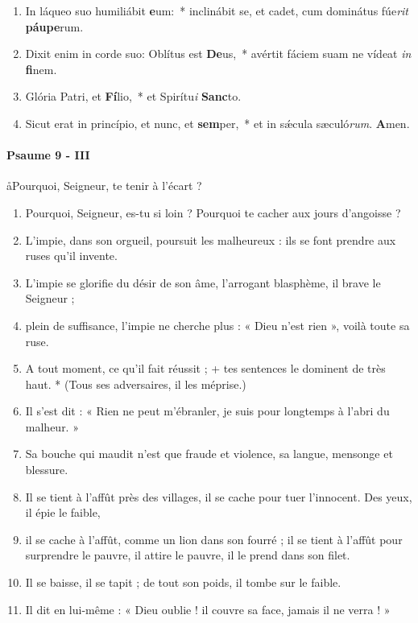 \documentclass[twoside]{article}
\begin{document}
\begin{paracol}[1]{2}
\begin{enumerate}[wide, itemsep=0mm, labelwidth=!, labelindent=0pt, label=\color{gregoriocolor}\theenumi]
\item In láqueo suo humiliábit \textbf{e}um:~* inclinábit se, et cadet, cum dominátus fúe\textit{rit} \textbf{páu}\textbf{pe}rum.
\item Dixit enim in corde suo: Oblítus est \textbf{De}us,~* avértit fáciem suam ne vídeat \textit{in} \textbf{fi}nem.
\item Glória Patri, et \textbf{Fí}lio,~* et Spirítu\textit{i} \textbf{Sanc}to.
\item Sicut erat in princípio, et nunc, et \textbf{sem}per,~* et in sǽcula sæculó\textit{rum}. \textbf{A}men.
\end{enumerate}

\switchcolumn

\paragraph{Psaume 9 - III}
\aa Pourquoi, Seigneur, te tenir à l'écart ?


\begin{enumerate}[wide, itemsep=0mm, labelwidth=!, labelindent=0pt, label=\color{gregoriocolor}\theenumi]
\item Pourquoi, Seigneur, es-tu si loin ? Pourquoi te cacher aux jours d'angoisse ?
\item L'impie, dans son orgueil, poursuit les malheureux : ils se font prendre aux ruses qu'il invente.
\item L'impie se glorifie du désir de son âme, l'arrogant blasphème, il brave le Seigneur ;
\item plein de suffisance, l'impie ne cherche plus : « Dieu n'est rien », voilà toute sa ruse.
\item A tout moment, ce qu'il fait réussit ; + tes sentences le dominent de très haut. * (Tous ses adversaires, il les méprise.)
\item Il s'est dit : « Rien ne peut m'ébranler, je suis pour longtemps à l'abri du malheur. »
\item Sa bouche qui maudit n'est que fraude et violence, sa langue, mensonge et blessure.
\item Il se tient à l'affût près des villages, il se cache pour tuer l'innocent. Des yeux, il épie le faible,
\item il se cache à l'affût, comme un lion dans son fourré ; il se tient à l'affût pour surprendre le pauvre, il attire le pauvre, il le prend dans son filet.
\item Il se baisse, il se tapit ; de tout son poids, il tombe sur le faible.
\item Il dit en lui-même : « Dieu oublie ! il couvre sa face, jamais il ne verra ! »
\end{enumerate}


\end{paracol}
\end{document}
